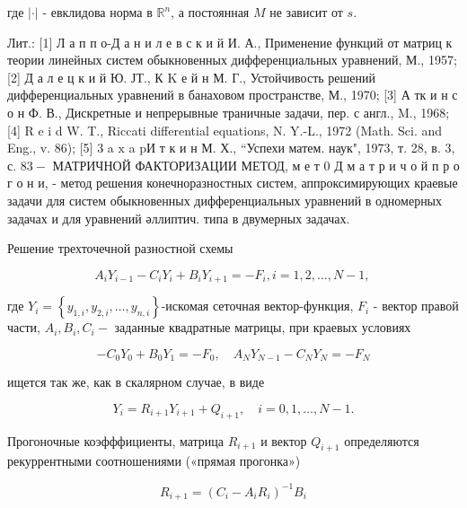 \documentclass[10pt]{article}
\begin{document}
где $|\cdot|$ - евклидова норма в $\mathbb{R}^{n}$, а постоянная $M$ не зависит от $s$.



Лит.: [1] Л а п п о-Д а н и л е в с к и й И. А., Применение функций от матриц к теории линейных систем обыкновенных дифференциальных уравнений, М., 1957; [2] Д а л е ц к и й Ю. ЈТ., К $\mathrm{K}$ е й н М. Г., Устойчивость решений дифференциальных уравнений в банаховом пространстве, М., 1970; [3] А тк и н с о н Ф. В., Дискретные и непрерывные траничные задачи, пер. с англ., M., 1968; [4] R e i d W. T., Riccati differential equations, N. Y.-L., 1972 (Math. Sci. and Eng., v. 86); [5] 3 a $\mathrm{x}$ a pИ т к и н М. Х., “Успехи матем. наук", 1973, т. 28, в. 3, с. $83-$ МАТРИЧНОЙ ФАКТОРИЗАЦИИ МЕТОД, м е т 0 Д м а т р и ч о й п р о г о н и, - метод решения конечноразностных систем, аппроксимирующих краевые задачи для систем обыкновенных дифференциальных уравнений в одномерных задачах и для уравнений әллиптич. типа в двумерных задачах.



Решение трехточечной разностной схемы



\[

A_{i} Y_{i-1}-C_{i} Y_{i}+B_{i} Y_{i+1}=-F_{i}, i=1,2, \ldots, N-1 \text {, }

\]



где $Y_{i}=\left\{y_{1, i}, y_{2, i}, \ldots, y_{n, i}\right\}$-искомая сеточная вектор-функция, $F_{i}$ - вектор правой части, $A_{i}, B_{i}, C_{i}-$ заданные квадратные матрицы, при краевых условиях



\[

-C_{0} Y_{0}+B_{0} Y_{1}=-F_{0}, \quad A_{N} Y_{N-1}-C_{N} Y_{N}=-F_{N}

\]



ищется так же, как в скалярном случае, в виде



\[

Y_{i}=R_{i+1} Y_{i+1}+Q_{i+1}, \quad i=0,1, \ldots, N-1 .

\]



Прогоночные коэфффициенты, матрица $R_{i+1}$ и вектор $Q_{i+1}$ определяются рекуррентными соотношениями («прямая прогонка»)



\[

R_{i+1}=\left(C_{i}-A_{i} R_{i}\right)^{-1} B_{i}

\]
\end{document}
